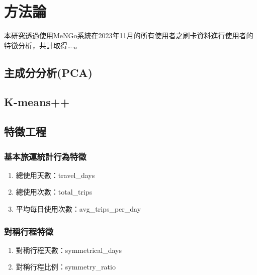 
\providecommand{\tightlist}{%
  \setlength{\itemsep}{0pt}\setlength{\parskip}{0pt}
}

\chapter{方法論}\label{ux65b9ux6cd5ux8ad6}

本研究透過使用MeNGo系統在2023年11月的所有使用者之刷卡資料進行使用者的特徵分析，共計取得\ldots.。

\section{主成分分析(PCA)}\label{ux4e3bux6210ux5206ux5206ux6790pca}

\section{K-means++}\label{k-means}

\section{特徵工程}\label{ux7279ux5fb5ux5de5ux7a0b}

\subsection{基本旅運統計行為特徵}\label{ux57faux672cux65c5ux904bux7d71ux8a08ux884cux70baux7279ux5fb5}

\begin{enumerate}
\def\labelenumi{\arabic{enumi}.}
\tightlist
\item
  總使用天數：travel\_days
\item
  總使用次數：total\_trips
\item
  平均每日使用次數：avg\_trips\_per\_day
\end{enumerate}

\subsection{對稱行程特徵}\label{ux5c0dux7a31ux884cux7a0bux7279ux5fb5}

\begin{enumerate}
\def\labelenumi{\arabic{enumi}.}
\tightlist
\item
  對稱行程天數：symmetrical\_days
\item
  對稱行程比例：symmetry\_ratio
\end{enumerate}

